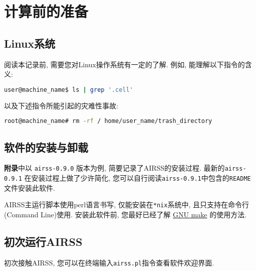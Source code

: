 \documentclass[a4paper, 10pt]{article}
\begin{document}
\newpage
\section{计算前的准备}
\subsection{Linux系统} 
阅读本记录前, 需要您对Linux操作系统有一定的了解. 例如, 能理解以下指令的含义:
\begin{lstlisting}[language={bash}]
user@machine_name$ ls | grep '.cell'
\end{lstlisting}

以及下述指令所能引起的灾难性事故:
\begin{lstlisting}[language={bash}]
root@machine_name# rm -rf / home/user_name/trash_directory
\end{lstlisting}
    
\subsection{软件的安装与卸载}
\textbf{附录}中以 \verb|airss-0.9.0| 版本为例, 简要记录了AIRSS的安装过程. 最新的\verb|airss-0.9.1| 在安装过程上做了少许简化, 您可以自行阅读\verb|airss-0.9.1|中包含的\verb|README|文件安装此软件.

AIRSS主运行脚本使用perl语言书写, 仅能安装在\verb|*nix|系统中, 且只支持在命令行(Command Line)使用. 安装此软件前, 您最好已经了解 \href{https://www.gnu.org/software/make/manual/}{GNU make} 的使用方法.

\subsection{初次运行AIRSS}
初次接触AIRSS, 您可以在终端输入\verb|airss.pl|指令查看软件欢迎界面.
\end{document}
